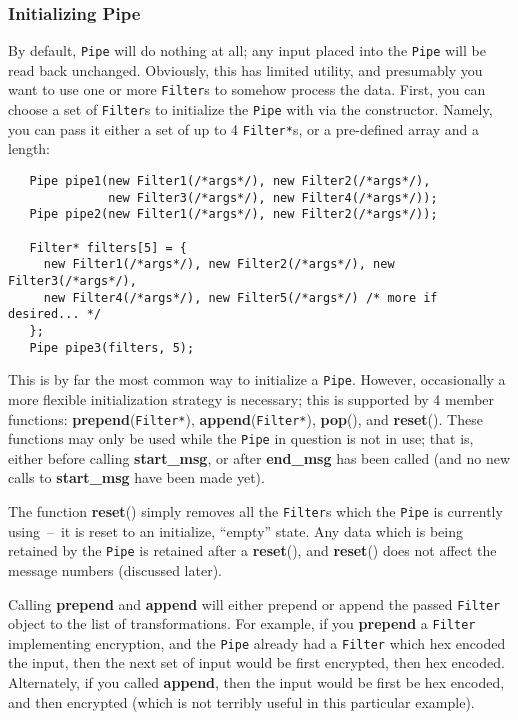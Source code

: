 \documentclass{article}
\newcommand{\function}[1]{\textbf{#1}}
\newcommand{\type}[1]{\texttt{#1}}
\begin{document}
\subsubsection{Initializing Pipe}

By default, \type{Pipe} will do nothing at all; any input placed into the
\type{Pipe} will be read back unchanged. Obviously, this has limited utility,
and presumably you want to use one or more \type{Filter}s to somehow process
the data. First, you can choose a set of \type{Filter}s to initialize the
\type{Pipe} with via the constructor. Namely, you can pass it either a set of
up to 4 \type{Filter*}s, or a pre-defined array and a length:

\begin{verbatim}
   Pipe pipe1(new Filter1(/*args*/), new Filter2(/*args*/),
              new Filter3(/*args*/), new Filter4(/*args*/));
   Pipe pipe2(new Filter1(/*args*/), new Filter2(/*args*/));

   Filter* filters[5] = {
     new Filter1(/*args*/), new Filter2(/*args*/), new Filter3(/*args*/),
     new Filter4(/*args*/), new Filter5(/*args*/) /* more if desired... */
   };
   Pipe pipe3(filters, 5);
\end{verbatim}

This is by far the most common way to initialize a \type{Pipe}. However,
occasionally a more flexible initialization strategy is necessary; this is
supported by 4 member functions: \function{prepend}(\type{Filter*}),
\function{append}(\type{Filter*}), \function{pop}(), and \function{reset}().
These functions may only be used while the \type{Pipe} in question is not in
use; that is, either before calling \function{start\_msg}, or after
\function{end\_msg} has been called (and no new calls to \function{start\_msg}
have been made yet).

The function \function{reset}() simply removes all the \type{Filter}s which the
\type{Pipe} is currently using~--~it is reset to an initialize, ``empty''
state.  Any data which is being retained by the \type{Pipe} is retained after a
\function{reset}(), and \function{reset}() does not affect the message numbers
(discussed later).

Calling \function{prepend} and \function{append} will either prepend or append
the passed \type{Filter} object to the list of transformations. For example, if
you \function{prepend} a \type{Filter} implementing encryption, and the
\type{Pipe} already had a \type{Filter} which hex encoded the input, then the
next set of input would be first encrypted, then hex encoded. Alternately, if
you called \function{append}, then the input would be first be hex encoded, and
then encrypted (which is not terribly useful in this particular example).
\end{document}
